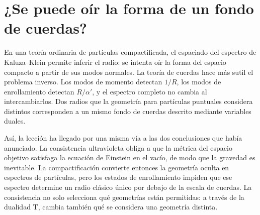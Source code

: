 \begin{classroomqa}
\end{classroomqa}

\section{¿Se puede oír la forma de un fondo de cuerdas?}

En una teoría ordinaria de partículas compactificada, el espaciado del
espectro de Kaluza--Klein permite inferir el radio: se intenta oír la forma
del espacio compacto a partir de sus modos normales. La teoría de cuerdas hace más sutil el
problema inverso. Los modos de momento detectan \(1/R\), los modos de enrollamiento detectan
\(R/\alpha'\), y el espectro completo no cambia al intercambiarlos. Dos radios que la geometría
para partículas puntuales considera distintos corresponden a un mismo fondo de cuerdas
descrito mediante variables duales.

Así, la lección ha llegado por una misma vía a las dos conclusiones que había anunciado.
La consistencia ultravioleta obliga a que la métrica del espacio objetivo satisfaga la
ecuación de Einstein en el vacío, de modo que la gravedad es inevitable. La
compactificación convierte entonces la geometría oculta en espectros de partículas, pero los
estados de enrollamiento impiden que ese espectro determine un radio clásico único por debajo
de la escala de cuerdas. La consistencia no solo selecciona qué geometrías están permitidas:
a través de la dualidad T, cambia también qué se considera una geometría distinta.
